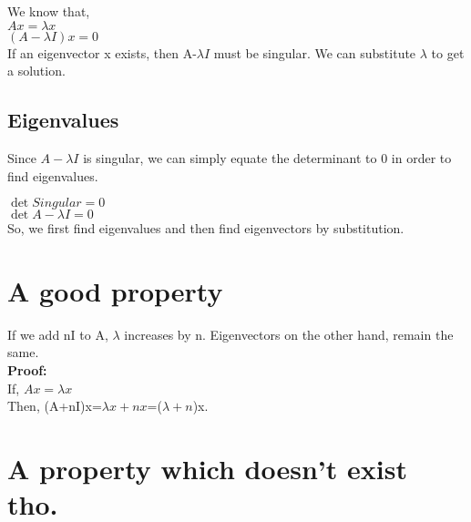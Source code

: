 \documentclass[]{article}
\begin{document}
\vspace{10pt}

\noindent
We know that,\\

\noindent
$Ax=\lambda x$\\

\noindent
$(A-\lambda I)x=0$\\

\noindent
If an eigenvector x exists, then A-$\lambda I$ must be singular. We can substitute $\lambda$ to get a solution.

\vspace{10pt}

\subsection{Eigenvalues}

\vspace{10pt}
Since $A-\lambda I$ is singular, we can simply equate the determinant to 0 in order to find eigenvalues.\\

\vspace{10pt}

\noindent
$\det{Singular}=0$\\

\noindent
$\det{A-\lambda I}=0$\\

\noindent
So, we first find eigenvalues and then find eigenvectors by substitution.\\

\vspace{10pt}

\section{A good property}

\vspace{10pt}

\noindent
If we add nI to A, $\lambda$ increases by n. Eigenvectors on the other hand, remain the same.\\

\noindent
\textbf{Proof:}\\

\noindent
If, $Ax=\lambda x$\\
Then, (A+nI)x=$\lambda x + nx$=($\lambda + n$)x.

\vspace{10pt}
\section{A property which doesn't exist tho.}
\vspace{10pt}
\end{document}
